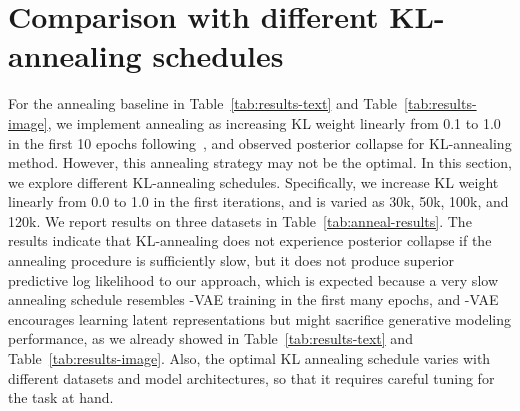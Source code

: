 \documentclass{article} \usepackage{iclr2019_conference,times}
\begin{document}
\begin{table}[h]
    \centering
    \caption{Evaluation of a trained VAE model trained by basic VAE training across 10 different random seeds. Mean values are reported and variance is given in parentheses. IW denotes the approximation to NLL we used in Section~\ref{sec:expresults}. }
    \label{tab:appx-iw-basic}
\end{table}

\section{Comparison with different KL-annealing schedules}\label{apdix:anneal}
For the annealing baseline in Table~\ref{tab:results-text} and Table~\ref{tab:results-image}, we implement annealing as increasing KL weight linearly from 0.1 to 1.0 in the first 10 epochs following~\citep{kim2018semi}, and observed posterior collapse for KL-annealing method. However, this annealing strategy may not be the optimal. In this section, we explore different KL-annealing schedules. Specifically, we increase KL weight linearly from 0.0 to 1.0 in the first  iterations, and  is varied as 30k, 50k, 100k, and 120k. We report results on three datasets in Table~\ref{tab:anneal-results}. The results indicate that KL-annealing does not experience posterior collapse if the annealing procedure is sufficiently slow, but it does not produce superior predictive log likelihood to our approach, which is expected because a very slow annealing schedule resembles -VAE training in the first many epochs, and -VAE encourages learning latent representations but might sacrifice generative modeling performance, as we already showed in Table~\ref{tab:results-text} and Table~\ref{tab:results-image}. Also, the optimal KL annealing schedule varies with different datasets and model architectures, so that it requires careful tuning for the task at hand.
\end{document}
